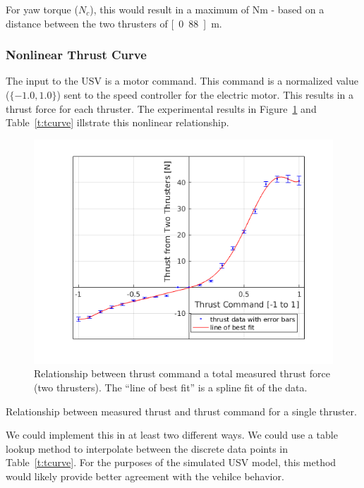 \documentclass[11pt,draftcls,journal,onecolumn]{IEEEtran}
\begin{document}
For yaw torque ($N_c$), this would result in a maximum of \unit[14]{Nm} - based on a distance between the two thrusters of \unit[0.88]{m}.

 
\subsubsection{Nonlinear Thrust Curve}
The input to the USV is a motor command.  This command is a normalized value ($\{-1.0,1.0\}$) sent to the speed controller for the electric motor.  This results in a thrust force for each thruster.  The experimental results in Figure~\ref{f:tcurve} and Table~\ref{t:tcurve} illstrate this nonlinear relationship.

\begin{figure}[htbp]
\centering
\includegraphics[width=0.9\linewidth]{thrust_cmd_relationship.png}
\caption{Relationship between thrust command a total measured thrust force (two thrusters). The ``line of best fit'' is a spline fit of the data.}
\label{f:tcurve}
\end{figure}

\begin{table}[hbt!] 
\renewcommand{\arraystretch}{1.2}
\caption{Relationship between measured thrust and thrust command for a single thruster.  }
\label{t:tcurve}
\centering
{}
\end{table}

We could implement this in at least two different ways.  We could use a table lookup method to interpolate between the discrete data points in Table~\ref{t:tcurve}.  For the purposes of the simulated USV model, this method would likely provide better agreement with the vehilce behavior.
\end{document}
